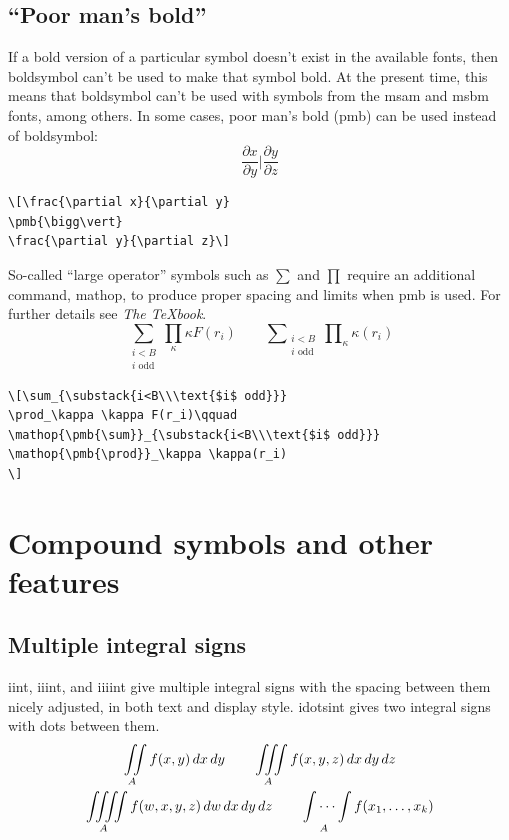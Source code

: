 \documentclass[manuscript, printscheme]{aomart}
\newcommand{\ntt}{\normalfont\ttfamily}
\newcommand{\cn}[1]{{\protect\ntt\bslash#1}}
\newcommand{\fn}[1]{{\protect\ntt#1}}
\newtheorem[{}\it]{thm}{Theorem}[section]
\theoremstyle{definition}
\newtheorem*[{}\it]{notation}{Notation}
\begin{document}
\subsection{``Poor man's bold''}
If a bold version of a particular symbol doesn't exist in the
available fonts,
then \cn{boldsymbol} can't be used to make that symbol bold.
At the present time, this means that
\cn{boldsymbol} can't be used with symbols from
the \fn{msam} and \fn{msbm} fonts, among others.
In some cases, poor man's bold (\cn{pmb}) can be used instead
of \cn{boldsymbol}:
\[\frac{\partial x}{\partial y}
\pmb{\bigg\vert}
\frac{\partial y}{\partial z}\]
\begin{verbatim}
\[\frac{\partial x}{\partial y}
\pmb{\bigg\vert}
\frac{\partial y}{\partial z}\]
\end{verbatim}
So-called ``large operator'' symbols such as $\sum$ and $\prod$
require an additional command, \cn{mathop},
to produce proper spacing and limits when \cn{pmb} is used.
For further details see \textit{The \TeX book}.
\[\sum_{\substack{i<B\\\text{$i$ odd}}}
\prod_\kappa \kappa F(r_i)\qquad
\mathop{\pmb{\sum}}_{\substack{i<B\\\text{$i$ odd}}}
\mathop{\pmb{\prod}}_\kappa \kappa(r_i)
\]
\begin{verbatim}
\[\sum_{\substack{i<B\\\text{$i$ odd}}}
\prod_\kappa \kappa F(r_i)\qquad
\mathop{\pmb{\sum}}_{\substack{i<B\\\text{$i$ odd}}}
\mathop{\pmb{\prod}}_\kappa \kappa(r_i)
\]
\end{verbatim}

\section{Compound symbols and other features}
\label{s:comp}
\subsection{Multiple integral signs}
\cn{iint}, \cn{iiint}, and \cn{iiiint} give multiple integral signs
with the spacing between them nicely adjusted,  in both text and
display style.  \cn{idotsint} gives two integral signs with dots
between them.
\begin{gather}
\iint\limits_A f(x,y)\,dx\,dy\qquad\iiint\limits_A
f(x,y,z)\,dx\,dy\,dz\\
\iiiint\limits_A
f(w,x,y,z)\,dw\,dx\,dy\,dz\qquad\idotsint\limits_A f(x_1,\dots,x_k)
\end{gather}
\end{document}
